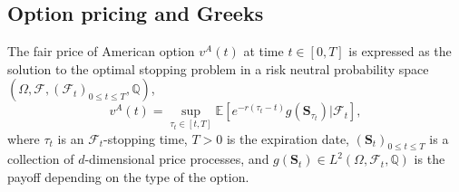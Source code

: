 \documentclass[10pt,a4paper]{amsart}
\numberwithin{equation}{section}
\numberwithin{algorithm}{section}
\theoremstyle{plain}
\theoremstyle{remark}
\begin{document}
\subsection{Option pricing and Greeks}
The fair price of American option $v^A(t)$ at time $t\in [0,T]$ is expressed as the solution to the optimal stopping problem in a risk neutral probability space $(\Omega, \mathcal{F}, (\mathcal{F}_t)_{0\le t\le T},\mathbb{Q})$,
\begin{equation*}
    v^A(t) = \sup_{\tau_t \in [t,T]} \mathbb{E}[e^{-r(\tau_t - t)} g(\mathbf{S}_{\tau_t} ) | \mathcal{F}_t],
\end{equation*}
where $\tau_t$ is an $\mathcal{F}_t$-stopping time, $T>0$ is the expiration date, $(\mathbf{S}_t)_{0\le t\le T}$ is a collection of $d$-dimensional price processes, and $g(\mathbf{S}_t) \in L^2(\Omega, \mathcal{F}_t, \mathbb{Q})$ is the payoff depending on the type of the option.
\end{document}
